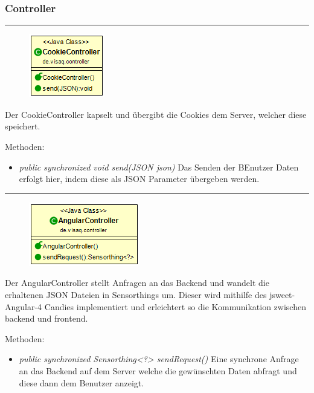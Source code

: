 \subsubsection{Controller}

\rule{\textwidth}{0.4pt}
\begin{minipage}{0.4\textwidth}
    \begin{figure}[H]
        {\centering\includegraphics[scale = 0.7]{media/frontend/controller/CookieController_Class.png}}
    \end{figure}
    \end{minipage} \hfill
    \begin{minipage}{0.6\textwidth}
Der CookieController kapselt und übergibt die Cookies dem Server, welcher diese speichert.
\end{minipage}

Methoden: \begin{itemize} 
    \item \emph{public synchronized void send(JSON json)} Das Senden der BEnutzer Daten erfolgt hier, indem diese als JSON Parameter übergeben werden.
\end{itemize}


\rule{\textwidth}{0.4pt}
\begin{minipage}{0.4\textwidth}
    \begin{figure}[H]
        {\centering\includegraphics[scale = 0.7]{media/frontend/controller/AngularController_Class.png}}
    \end{figure}
    \end{minipage} \hfill
    \begin{minipage}{0.6\textwidth}
Der AngularController stellt Anfragen an das Backend und wandelt die erhaltenen JSON Dateien in Sensorthings um. Dieser wird mithilfe des jsweet-Angular-4 Candies implementiert und erleichtert so die Kommunikation zwischen backend und frontend.
\end{minipage}
Methoden: \begin{itemize}
    \item \emph{public synchronized Sensorthing<?> sendRequest()} Eine synchrone Anfrage an das Backend auf dem Server welche die gewünschten Daten abfragt und diese dann dem Benutzer anzeigt.
\end{itemize}